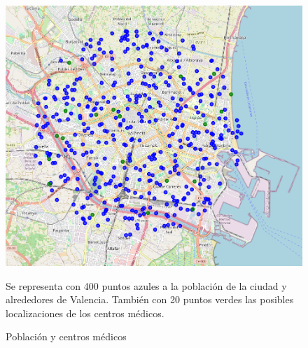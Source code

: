 \documentclass[12pt,a4paper]{book}
\begin{document}
\begin{figure}[htbp]
    \centering
    \begin{minipage}[c]{0.45\textwidth}
        \includegraphics[width=\textwidth]{images/ejemplo_centros_medicos.png}
        \label{fig:poblacion_centros_medicos}
    \end{minipage}
    \hfill
    \begin{minipage}[c]{0.45\textwidth}

        Se representa con 400 puntos azules a la población de la ciudad y alrededores de Valencia. También con 20 puntos verdes las posibles localizaciones de los centros médicos.
    \end{minipage}
    \caption{Población y centros médicos}
\end{figure}
\end{document}
